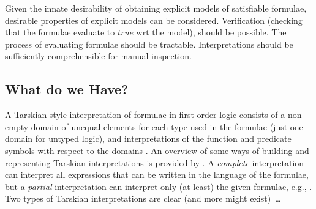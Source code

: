 \documentclass{easychair}
\begin{document}
Given the innate desirability of obtaining explicit models of satisfiable formulae, desirable
properties of explicit models can be considered.
Verification (checking that the formulae evaluate to $true$ wrt the model), should be possible.
The process of evaluating formulae should be tractable.
Interpretations should be sufficiently comprehensible for manual inspection.

\subsection{What do we Have?}
\label{Have}

A Tarskian-style interpretation \cite{TV56} of formulae in first-order logic consists of a 
non-empty domain of unequal elements for each type used in the formulae (just one domain for 
untyped logic), and interpretations of the function and predicate symbols with respect to the 
domains \cite{Hun96,Gal15}.
An overview of some ways of building and representing Tarskian interpretations is provided 
by \cite{CLP04}.
A {\em complete} interpretation can interpret all expressions that can be written in the language 
of the formulae, but a {\em partial} interpretation can interpret only (at least) the 
given formulae, e.g., \cite{BSW23}.
Two types of Tarskian interpretations are clear (and more might exist)~\ldots
\end{document}
